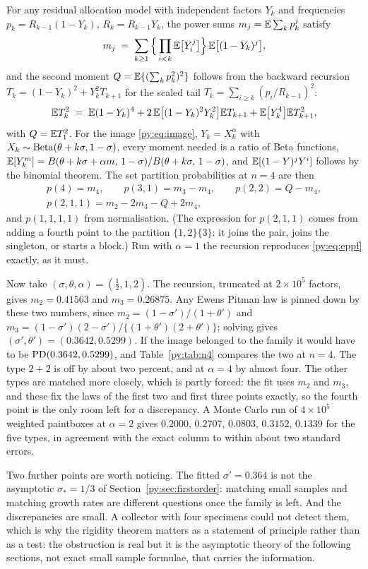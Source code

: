 \begin{example}[The failure at $n = 4$, computed exactly]
\label{py:ex:n4}
For any residual allocation model with independent factors $Y_k$ and frequencies
$p_k = R_{k-1}(1-Y_k)$, $R_k = R_{k-1}Y_k$, the power sums $m_j = \mathbb{E}\sum_k p_k^{j}$ satisfy
\[
m_j \;=\; \sum_{k\ge1}\Big\{\prod_{i<k}\mathbb{E}\big[Y_i^{j}\big]\Big\}\,\mathbb{E}\big[(1-Y_k)^{j}\big],
\]
and the second moment $Q = \mathbb{E}\{(\sum_k p_k^2)^2\}$ follows from the backward recursion
$T_k = (1-Y_k)^2 + Y_k^2T_{k+1}$ for the scaled tail $T_k = \sum_{i\ge k}(p_i/R_{k-1})^2$:
\[
\mathbb{E} T_k^2 \;=\; \mathbb{E}(1-Y_k)^4 + 2\,\mathbb{E}\big[(1-Y_k)^2Y_k^2\big]\mathbb{E} T_{k+1} + \mathbb{E}\big[Y_k^4\big]\mathbb{E} T_{k+1}^2 ,
\]
with $Q = \mathbb{E} T_1^2$. For the image \eqref{py:eq:image}, $Y_k = X_k^{\alpha}$ with
$X_k \sim \mathrm{Beta}(\theta+k\sigma, 1-\sigma)$, every moment needed is a ratio of Beta functions,
$\mathbb{E}[Y_k^{m}] = B(\theta+k\sigma+\alpha m,\,1-\sigma)/B(\theta+k\sigma,\,1-\sigma)$, and
$\mathbb{E}[(1-Y)^jY^i]$ follows by the binomial theorem. The set partition probabilities at $n = 4$ are
then
\[
\begin{gathered}
p(4) = m_4,\qquad p(3,1) = m_3-m_4,\qquad p(2,2) = Q-m_4,\\
p(2,1,1) = m_2-2m_3-Q+2m_4,
\end{gathered}
\]
and $p(1,1,1,1)$ from normalisation. (The expression for $p(2,1,1)$ comes from adding a fourth
point to the partition $\{1,2\}\{3\}$: it joins the pair, joins the singleton, or starts a block.)
Run with $\alpha = 1$ the recursion reproduces \eqref{py:eq:eppf} exactly, as it must.

Now take $(\sigma,\theta,\alpha) = (\tfrac12,1,2)$. The recursion, truncated at $2\times10^{5}$
factors, gives $m_2 = 0.41563$ and $m_3 = 0.26875$. Any Ewens Pitman law is pinned down by these
two numbers, since $m_2 = (1-\sigma')/(1+\theta')$ and
$m_3 = (1-\sigma')(2-\sigma')/\{(1+\theta')(2+\theta')\}$; solving gives
$(\sigma',\theta') = (0.3642, 0.5299)$. If the image belonged to the family it would have to be
$\mathrm{PD}(0.3642, 0.5299)$, and Table~\ref{py:tab:n4} compares the two at $n = 4$. The type $2{+}2$ is
off by about two percent, and at $\alpha = 4$ by almost four. The other types are matched more
closely, which is partly forced: the fit uses $m_2$ and $m_3$, and these fix the laws of the
first two and first three points exactly, so the fourth point is the only room left for a
discrepancy. A Monte Carlo
run of $4\times10^{5}$ weighted paintboxes at $\alpha = 2$ gives $0.2000$, $0.2707$, $0.0803$,
$0.3152$, $0.1339$ for the five types, in agreement with the exact column to within about two
standard errors.

Two further points are worth noticing. The fitted $\sigma' = 0.364$ is not the asymptotic
$\sigma_* = 1/3$ of Section~\ref{py:sec:firstorder}: matching small samples and matching growth
rates are different questions once the family is left. And the discrepancies are small. A collector
with four specimens could not detect them, which is why the rigidity theorem matters as a statement
of principle rather than as a test: the obstruction is real but it is the asymptotic theory of the
following sections, not exact small sample formulae, that carries the information.
\end{example}

